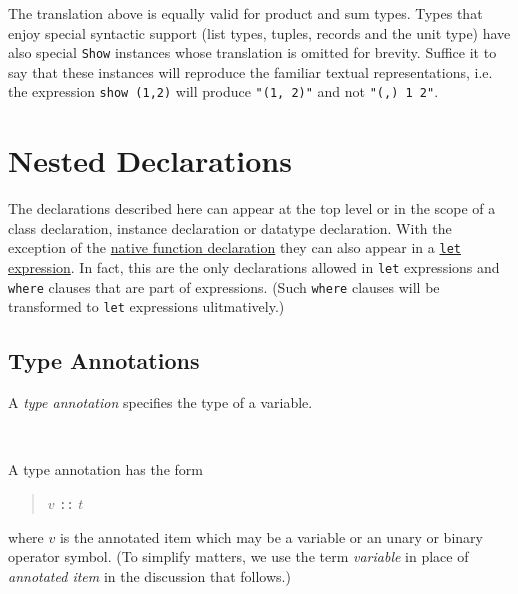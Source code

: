 The translation above is equally valid for product and sum types. Types that enjoy special syntactic support (list types, tuples, records and the unit type) have also special \texttt{Show} instances whose translation is omitted for brevity. Suffice it to say that these instances will reproduce the familiar textual representations, i.e. the expression \texttt{show (1,2)} will produce \texttt{"(1, 2)"} and not \texttt{"(,) 1 2"}.

\section{Nested Declarations} \label{decl}

The declarations described here can appear at the top level or in the scope of a class  declaration, instance declaration or datatype declaration. With the exception of the \hyperref[nativefun]{native function declaration} they can also appear in a \hyperref[letexpr]{\texttt{let} expression}. In fact, this are the only declarations allowed in \texttt{let} expressions and \texttt{where} clauses that are part of expressions. (Such \texttt{where} clauses will be transformed to \texttt{let} expressions ulitmatively.)

\begin{flushleft}
  
  \alt {}        
  \alt {}      
\end{flushleft}

\subsection{Type Annotations} \label{annotation}

A \emph{type annotation} specifies the type of a variable.

\begin{flushleft}
  \sym{::} \\
  \oder{}  \oder{} 
\end{flushleft}

A type annotation has the form
\begin{quote}
$v$ \texttt{::} $t$
\end{quote}
where $v$ is the annotated item which may be a variable or an unary or binary operator symbol. (To simplify matters, we use the term \emph{variable} in place of \emph{annotated item} in the discussion that follows.)

